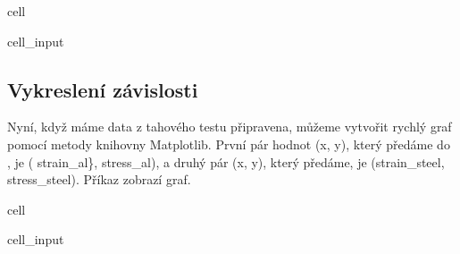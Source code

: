 \documentclass[letterpaper,10pt,english]{jupyterBook}
\begin{document}
{{\begin{sphinxuseclass}{cell}
\begin{sphinxVerbatimInput}
\begin{sphinxuseclass}{cell_input}
\begin{sphinxVerbatim}[commandchars=\\\{\}]
  \PYG{p}{[}\PYG{p}{]}
  \PYG{p}{[}\PYG{p}{]}
\end{sphinxVerbatim}

\end{sphinxuseclass}\end{sphinxVerbatimInput}

\end{sphinxuseclass}

\subsection{Vykreslení závislosti}
\label{\detokenize{Prednasky/2_7_P_u0159_xedklad _tahov_xe9_zkou_u0161ky:vykresleni-zavislosti}}
\sphinxAtStartPar
Nyní, když máme data z tahového testu připravena, můžeme vytvořit rychlý graf pomocí metody  knihovny Matplotlib. První pár hodnot (x, y), který předáme do , je ( strain\_al\}, stress\_al), a druhý pár (x, y), který předáme, je (strain\_steel, stress\_steel). Příkaz  zobrazí graf.

\begin{sphinxuseclass}{cell}\begin{sphinxVerbatimInput}

\begin{sphinxuseclass}{cell_input}
\begin{sphinxVerbatim}[commandchars=\\\{\}]
  

   

\end{sphinxVerbatim}

\end{sphinxuseclass}\end{sphinxVerbatimInput}
\begin{sphinxVerbatimOutput}


\end{sphinxVerbatimOutput}
\end{sphinxuseclass}}}
\end{document}
